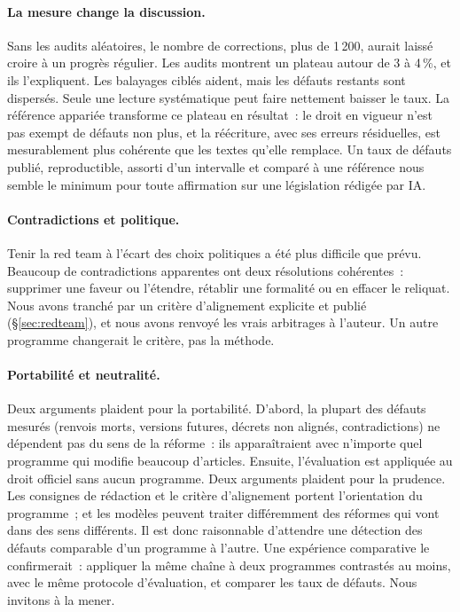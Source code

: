 \documentclass[11pt,a4paper]{article}
\begin{document}
\paragraph{La mesure change la discussion.}
Sans les audits aléatoires, le nombre de corrections, plus de 1\,200, aurait laissé croire à un progrès régulier. Les audits montrent un plateau autour de 3 à 4\,\%, et ils l'expliquent. Les balayages ciblés aident, mais les défauts restants sont dispersés. Seule une lecture systématique peut faire nettement baisser le taux. La référence appariée transforme ce plateau en résultat~: le droit en vigueur n'est pas exempt de défauts non plus, et la réécriture, avec ses erreurs résiduelles, est mesurablement plus cohérente que les textes qu'elle remplace. Un taux de défauts publié, reproductible, assorti d'un intervalle et comparé à une référence nous semble le minimum pour toute affirmation sur une législation rédigée par IA.

\paragraph{Contradictions et politique.}
Tenir la red team à l'écart des choix politiques a été plus difficile que prévu. Beaucoup de contradictions apparentes ont deux résolutions cohérentes~: supprimer une faveur ou l'étendre, rétablir une formalité ou en effacer le reliquat. Nous avons tranché par un critère d'alignement explicite et publié (\S\ref{sec:redteam}), et nous avons renvoyé les vrais arbitrages à l'auteur. Un autre programme changerait le critère, pas la méthode.

\paragraph{Portabilité et neutralité.}
Deux arguments plaident pour la portabilité. D'abord, la plupart des défauts mesurés (renvois morts, versions futures, décrets non alignés, contradictions) ne dépendent pas du sens de la réforme~: ils apparaîtraient avec n'importe quel programme qui modifie beaucoup d'articles. Ensuite, l'évaluation est appliquée au droit officiel sans aucun programme. Deux arguments plaident pour la prudence. Les consignes de rédaction et le critère d'alignement portent l'orientation du programme~; et les modèles peuvent traiter différemment des réformes qui vont dans des sens différents. Il est donc raisonnable d'attendre une détection des défauts comparable d'un programme à l'autre. Une expérience comparative le confirmerait~: appliquer la même chaîne à deux programmes contrastés au moins, avec le même protocole d'évaluation, et comparer les taux de défauts. Nous invitons à la mener.
\end{document}
